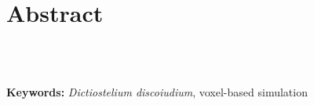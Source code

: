 \documentclass[10pt,letterpaper]{article}
\begin{document}
\section*{Abstract}
\textbf{} \\~


\noindent \textbf{Keywords:} \textit{Dictiostelium discoiudium}, voxel-based simulation
\hspace{2in}




\linenumbers
\end{document}
